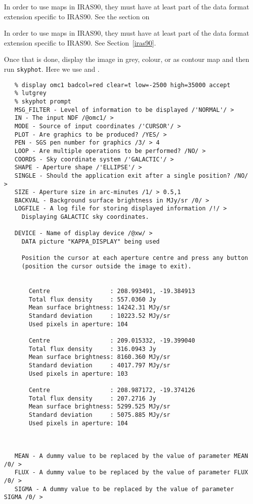 \begin{htmlonly}
   In order to use maps in IRAS90, they must have at least part
   of the data format extension specific to IRAS90. See the section on
\end{htmlonly}
\begin{latexonly}
   In order to use maps in IRAS90, they must have at least part
   of the data format extension specific to IRAS90. See
Section~\ref{iras90}.
\end{latexonly}

   Once that is done, display the image in grey, colour, or as contour
   map and then run {\tt skyphot}. Here we use
{\tt {}}
   and
{\tt {}}.

\begin{verbatim}
   % display omc1 badcol=red clear=t low=-2500 high=35000 accept
   % lutgrey
   % skyphot prompt
   MSG_FILTER - Level of information to be displayed /'NORMAL'/ >
   IN - The input NDF /@omc1/ >
   MODE - Source of input coordinates /'CURSOR'/ >
   PLOT - Are graphics to be produced? /YES/ >
   PEN - SGS pen number for graphics /3/ > 4
   LOOP - Are multiple operations to be performed? /NO/ >
   COORDS - Sky coordinate system /'GALACTIC'/ >
   SHAPE - Aperture shape /'ELLIPSE'/ >
   SINGLE - Should the application exit after a single position? /NO/ >
   SIZE - Aperture size in arc-minutes /1/ > 0.5,1
   BACKVAL - Background surface brightness in MJy/sr /0/ >
   LOGFILE - A log file for storing displayed information /!/ >
     Displaying GALACTIC sky coordinates.

   DEVICE - Name of display device /@xw/ >
     DATA picture "KAPPA_DISPLAY" being used

     Position the cursor at each aperture centre and press any button
     (position the cursor outside the image to exit).


       Centre                 : 208.993491, -19.384913
       Total flux density     : 557.0360 Jy
       Mean surface brightness: 14242.31 MJy/sr
       Standard deviation     : 10223.52 MJy/sr
       Used pixels in aperture: 104

       Centre                 : 209.015332, -19.399040
       Total flux density     : 316.0943 Jy
       Mean surface brightness: 8160.360 MJy/sr
       Standard deviation     : 4017.797 MJy/sr
       Used pixels in aperture: 103

       Centre                 : 208.987172, -19.374126
       Total flux density     : 207.2716 Jy
       Mean surface brightness: 5299.525 MJy/sr
       Standard deviation     : 5075.885 MJy/sr
       Used pixels in aperture: 104



   MEAN - A dummy value to be replaced by the value of parameter MEAN /0/ >
   FLUX - A dummy value to be replaced by the value of parameter FLUX /0/ >
   SIGMA - A dummy value to be replaced by the value of parameter SIGMA /0/ >
\end{verbatim}

